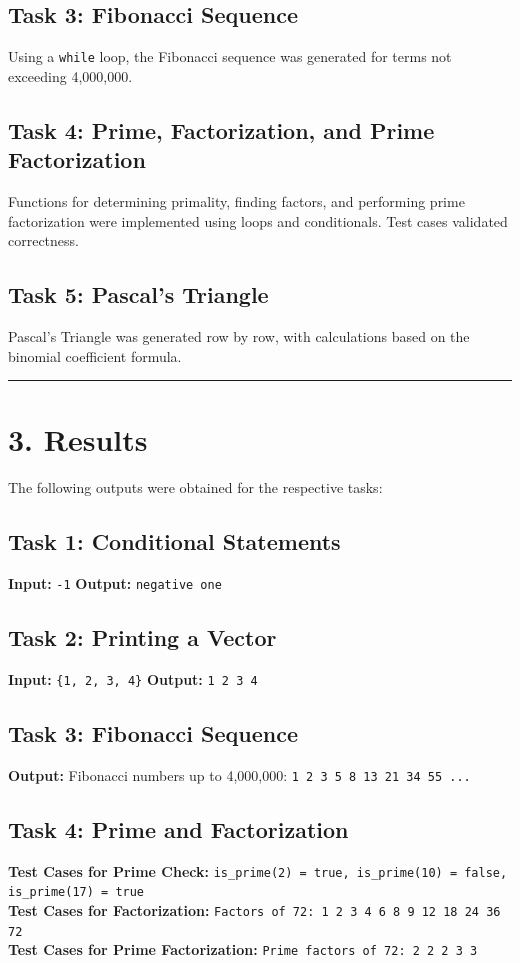 \documentclass[12pt]{article}
\begin{document}
\subsection*{Task 3: Fibonacci Sequence}
Using a \texttt{while} loop, the Fibonacci sequence was generated for terms not exceeding 4,000,000.

\subsection*{Task 4: Prime, Factorization, and Prime Factorization}
Functions for determining primality, finding factors, and performing prime factorization were implemented using loops and conditionals. Test cases validated correctness.

\subsection*{Task 5: Pascal's Triangle}
Pascal's Triangle was generated row by row, with calculations based on the binomial coefficient formula.
\vspace{6pt}
\hrule
\section*{3. Results}

The following outputs were obtained for the respective tasks:

\subsection*{Task 1: Conditional Statements}
\textbf{Input:} \texttt{-1} \newline
\textbf{Output:} \texttt{negative one}

\subsection*{Task 2: Printing a Vector}
\textbf{Input:} \texttt{\{1, 2, 3, 4\}} \newline
\textbf{Output:} \texttt{1 2 3 4}

\subsection*{Task 3: Fibonacci Sequence}
\textbf{Output:} Fibonacci numbers up to 4,000,000: \newline
\texttt{1 2 3 5 8 13 21 34 55 ...}

\subsection*{Task 4: Prime and Factorization}
\textbf{Test Cases for Prime Check:} \newline
\texttt{is\_prime(2) = true, is\_prime(10) = false, is\_prime(17) = true} \\[8pt]
\textbf{Test Cases for Factorization:} \newline
\texttt{Factors of 72: 1 2 3 4 6 8 9 12 18 24 36 72} \\[8pt]
\textbf{Test Cases for Prime Factorization:} \newline
\texttt{Prime factors of 72: 2 2 2 3 3}
\end{document}
